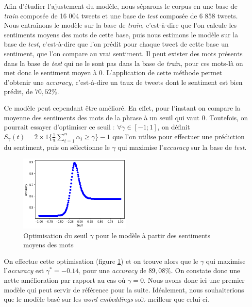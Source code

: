 \documentclass[11pt,french,french]{article}
\begin{document}
Afin d'étudier l'ajustement du modèle, nous séparons le corpus en une
base de \emph{train} composée de 16 004 tweets et une base de
\emph{test} composée de 6 858 tweets. Nous entraînons le modèle sur la
base de \emph{train}, c'est-à-dire que l'on calcule les sentiments
moyens des mots de cette base, puis nous estimons le modèle sur la base
de \emph{test}, c'est-à-dire que l'on prédit pour chaque tweet de cette
base un sentiment, que l'on compare au vrai sentiment. Il peut exister
des mots présents dans la base de \emph{test} qui ne le sont pas dans la
base de \emph{train}, pour ces mots-là on met donc le sentiment moyen à
0. L'application de cette méthode permet d'obtenir une \emph{accuracy},
c'est-à-dire un taux de tweets dont le sentiment est bien prédit, de
\(70,52\%\).

Ce modèle peut cependant être amélioré. En effet, pour l'instant on
compare la moyenne des sentiments des mots de la phrase à un seuil qui
vaut 0. Toutefois, on pourrait essayer d'optimiser ce seuil :
\(\forall \gamma \in [-1;1]\), on définit
\(S_{\gamma}(t) = 2 \times 1\{ \frac{1}{n} \sum \limits_{i=1}^n \alpha_i \geq \gamma\} - 1\)
que l'on utilise pour effectuer une prédiction du sentiment, puis on
sélectionne le \(\gamma\) qui maximise l'\emph{accuracy} sur la base de
\emph{test}.

\begin{figure}
\begin{center}
\includegraphics[width=0.5\textwidth]{img/max_baseline.png}
\captionsetup{margin=0cm,format=hang,justification=justified}
\caption{Optimisation du seuil $\gamma$ pour le modèle à partir des sentiments moyens des mots}\label{fig:max_baseline}
\end{center}
\end{figure}

On effectue cette optimisation (figure \ref{fig:max_baseline}) et on
trouve alors que le \(\gamma\) qui maximise l'\emph{accuracy} est
\(\gamma^* = -0.14\), pour une \emph{accuracy} de \(89,08\%\). On
constate donc une nette amélioration par rapport au cas où
\(\gamma = 0\). Nous avons donc ici une premier modèle qui peut servir
de référence pour la suite. Idéalement, nous souhaiterions que le modèle
basé sur les \emph{word-embeddings} soit meilleur que celui-ci.
\end{document}
